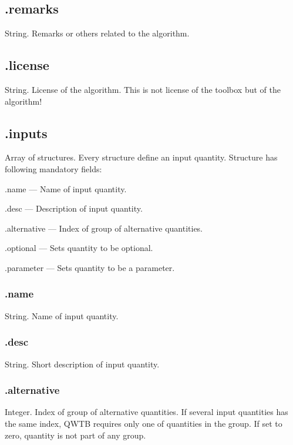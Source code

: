 \documentclass[12pt,a4paper,oneside]{report} %
\begin{document}
\subsection{\textsf{.remarks}} %
String. Remarks or others related to the algorithm.

\subsection{\textsf{.license}} %
String. License of the algorithm. This is not license of the toolbox but of the algorithm!

\subsection{\textsf{.inputs}} %
Array of structures. Every structure define an input quantity. Structure has following mandatory
fields:
\begin{tightdesc}
        \item [\textsf{.name}] --- Name of input quantity.
        \item [\textsf{.desc}] --- Description of input quantity.
        \item [\textsf{.alternative}] --- Index of group of alternative quantities.
        \item [\textsf{.optional}] --- Sets quantity to be optional.
        \item [\textsf{.parameter}] --- Sets quantity to be a parameter.
\end{tightdesc}

\subsubsection{\textsf{.name}} %
String. Name of input quantity.

\subsubsection{\textsf{.desc}} %
String. Short description of input quantity.

\subsubsection{\textsf{.alternative}} %
Integer. Index of group of alternative quantities. If several input quantities has the same index,
QWTB requires only one of quantities in the group. If set to zero, quantity is not part of any group.
\end{document}

